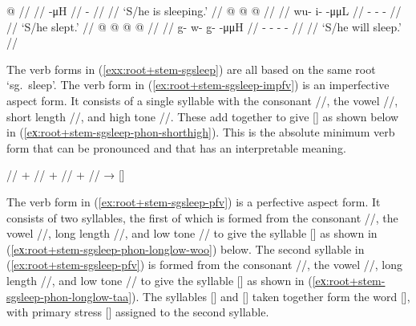 \pex\label{exx:root+stem-sgsleep}%
\a\label{ex:root+stem-sgsleep-impfv}%
%
\begingl
	\gla	{} @ {} //
	\glp	\llap{[}\rlap{\ipa{\gm{tʰá}}]} {} //
	\glb	{} -μH //
	\glc	{} - //
	\gld	{} {} //
	\glft	‘S/he is sleeping.’
		//
\endgl
\a\label{ex:root+stem-sgsleep-pfv}%
%
\begingl
	\gla	{} @ {} @ {} @ {} //
	\glp	\llap{[}\rlap{\ipa{wùː.ˈ\gm{tʰàː}}]} {} {} {} //
	\glb	wu- i-  -μμL //
	\glc	{}- -  - //
	\gld	{} {} {} {} //
	\glft	‘S/he slept.’
		//
\endgl
\a\label{ex:root+stem-sgsleep-prsp}%
%
\begingl
	\gla	{} @ {} @ {} @ {} @ {} //
	\glp	\llap{[}\rlap{\ipa{kʷùː.qà.ˈ\gm{tʰáː}}]} {} {} {} {} //
	\glb	g- w- g̱-  -μμH //
	\glc	{}- - -  - //
	\gld	{} {} {} {} {} //
	\glft	‘S/he will sleep.’
		//
\endgl
\xe

The verb forms in (\ref{exx:root+stem-sgsleep}) are all based on the same root  ‘sg.\ sleep’.
The verb form in (\ref{ex:root+stem-sgsleep-impfv}) is an imperfective aspect form.
It consists of a single syllable with the consonant //, the vowel //, short length //, and high tone //.
These add together to give [] as shown below in (\ref{eх:root+stem-sgsleep-phon-shorthigh}).
This is the absolute minimum verb form that can be pronounced and that has an interpretable meaning.

\ex\label{eх:root+stem-sgsleep-phon-shorthigh}%
%
	// + // + // + //
	→ []
\xe

The verb form in (\ref{ex:root+stem-sgsleep-pfv}) is a perfective aspect form.
It consists of two syllables, the first of which is formed from the consonant //, the vowel //, long length //, and low tone // to give the syllable [] as shown in (\ref{eх:root+stem-sgsleep-phon-longlow-woo}) below.
The second syllable in (\ref{ex:root+stem-sgsleep-pfv}) is formed from the consonant //, the vowel //, long length //, and low tone // to give the syllable [] as shown in (\ref{eх:root+stem-sgsleep-phon-longlow-taa}).
The syllables [] and [] taken together form the word [], with primary stress [] assigned to the second syllable.

